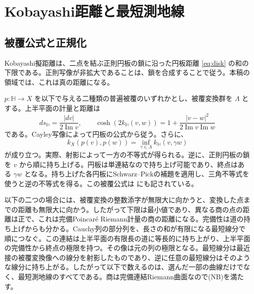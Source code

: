 \documentclass[12pt]{amsart}
\theoremstyle{definition}
\theoremstyle{remark}
\numberwithin{equation}{section}
\begin{document}
\section{Kobayashi距離と最短測地線}\label{sec:geometry}
\subsection{被覆公式と正規化}
Kobayashi擬距離は、二点を結ぶ正則円板の鎖に沿った円板距離 \eqref{eq:disk} の和の下限である。正則写像が非拡大であることは、鎖を合成することで従う。本稿の領域では、これは真の距離になる。

$p:\mathbb H\to X$ を以下で与える二種類の普遍被覆のいずれかとし、被覆変換群を $\Lambda$ とする。上半平面の計量と距離は
\begin{equation}\label{eq:halfplane}
 ds_{\mathbb H}=\frac{|dv|}{2\operatorname{Im}v},\qquad
 \cosh(2k_{\mathbb H}(v,w))=1+\frac{|v-w|^2}{2\operatorname{Im}v\operatorname{Im}w}
\end{equation}
である。Cayley写像によって円板の公式から従う。さらに、
\begin{equation}\label{eq:quotient}
 k_X(p(v),p(w))=\inf_{\gamma\in\Lambda}k_{\mathbb H}(v,\gamma w)
\end{equation}
が成り立つ。実際、射影によって一方の不等式が得られる。逆に、正則円板の鎖を $v$ から順に持ち上げる。円板は単連結なので持ち上げ可能であり、終点はある $\gamma w$ となる。持ち上げた各円板にSchwarz--Pickの補題を適用し、三角不等式を使うと逆の不等式を得る。この被覆公式は \cite[Proposition 1.1]{Winkelmann} にも記されている。

以下の二つの場合には、被覆変換の整数添字が無限大に向かうと、変換した点までの距離も無限大に向かう。したがって下限は最小値であり、異なる商の点の距離は正で、これは完備Poincar\'e Riemann計量の商の距離になる。完備性は道の持ち上げからも分かる。Cauchy列の部分列を、長さの和が有限になる最短線分で順につなぐ。この連結は上半平面の有限長の道に等長的に持ち上がり、上半平面の完備性から終点の極限を持つ。その像は元の列の極限となる。最短線分は最近接の被覆変換像への線分を射影したものであり、逆に任意の最短線分はそのような線分に持ち上がる。したがって以下で数えるのは、選んだ一部の曲線だけでなく、最短測地線のすべてである。商は完備連結Riemann曲面なので(NB)を満たす。
\end{document}
